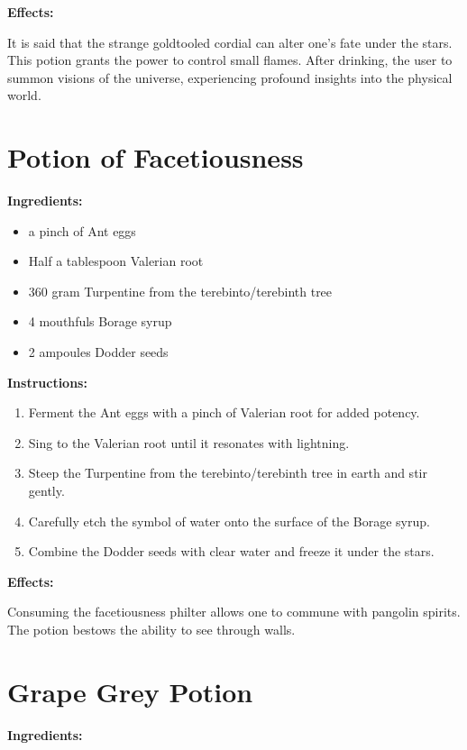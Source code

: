 \documentclass{article}
\begin{document}
\textbf{Effects:}

It is said that the strange goldtooled cordial can alter one's fate under the stars. This potion grants the power to control small flames. After drinking, the user to summon visions of the universe, experiencing profound insights into the physical world.

\newpage
\section*{Potion of Facetiousness}

\textbf{Ingredients:}

\begin{itemize}
  \item a pinch of Ant eggs
  \item Half a tablespoon Valerian root
  \item 360 gram Turpentine from the terebinto/terebinth tree
  \item 4 mouthfuls Borage syrup
  \item 2 ampoules Dodder seeds
\end{itemize}

\textbf{Instructions:}

\begin{enumerate}
  \item Ferment the Ant eggs with a pinch of Valerian root for added potency.
  \item Sing to the Valerian root until it resonates with lightning.
  \item Steep the Turpentine from the terebinto/terebinth tree in earth and stir gently.
  \item Carefully etch the symbol of water onto the surface of the Borage syrup.
  \item Combine the Dodder seeds with clear water and freeze it under the stars.
\end{enumerate}

\textbf{Effects:}

Consuming the facetiousness philter allows one to commune with pangolin spirits. The potion bestows the ability to see through walls.

\newpage
\section*{Grape Grey Potion}

\textbf{Ingredients:}
\end{document}

